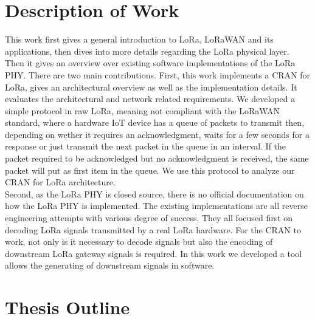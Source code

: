 \section{Description of Work}
This work first gives a general introduction to LoRa, LoRaWAN and its applications, then dives 
into more details regarding the LoRa physical layer. Then it gives an overview over existing 
software implementations of the LoRa PHY. There are two main contributions. First, this work 
implements a CRAN for LoRa, gives an architectural overview as well as the implementation details.
It evaluates the architectural and network related requirements. We developed a simple protocol in raw LoRa,
meaning not compliant with the LoRaWAN standard, where a hardware IoT device has a queue of packets to transmit then, depending on 
wether it requires an acknowledgment, waits for a few seconds for a response or just transmit the next packet in the queue in an interval.
If the packet required to be acknowledged but no acknowledgment is received, the same packet will put as first item in the queue.
We use this protocol to analyze our CRAN for LoRa architecture.
\\
Second, as the LoRa PHY is closed source, there is no official documentation on how the LoRa PHY is implemented.
The existing implementations are all reverse engineering attempts with various degree of success. 
They all focused first on decoding LoRa signals transmitted by a real LoRa hardware. For the CRAN to work, not only is it 
necessary to decode signals but also the encoding of downstream LoRa gateway signals is required. In this work we developed a tool 
allows the generating of downstream signals in software.


\section{Thesis Outline}

